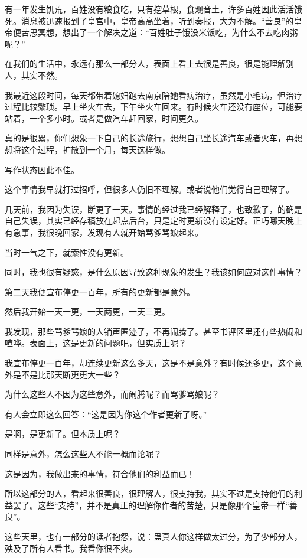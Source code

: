 \begin{this_body}
有一年发生饥荒，百姓没有粮食吃，只有挖草根，食观音土，许多百姓因此活活饿死。消息被迅速报到了皇宫中，皇帝高高坐着，听到奏报，大为不解。“善良”的皇帝便苦思冥想，想出了一个解决之道：“百姓肚子饿没米饭吃，为什么不去吃肉粥呢？”

在我们的生活中，永远有那么一部分人，表面上看上去很是善良，很是能理解别人，其实不然。

我最近这段时间，每天都带着媳妇跑去南京陪她看病治疗，虽然是小毛病，但治疗过程比较繁琐。早上坐火车去，下午坐火车回来。有时候火车还没有座位，可能要站着，一个多小时。或者是做汽车赶回家，时间更久。

真的是很累，你们想象一下自己的长途旅行，想想自己坐长途汽车或者火车，再想想将这个过程，扩散到一个月，每天这样做。

写作状态因此不佳。

这个事情我早就打过招呼，但很多人仍旧不理解。或者说他们觉得自己理解了。

几天前，我因为失误，断更了一天。事情的经过我已经解释了，也致歉了，的确是自己失误，其实已经存稿放在起点后台，只是定时更新没有设定好。正巧哪天晚上有急事，我很晚回家，发现有人就开始骂爹骂娘起来。

当时一气之下，就索性没有更新。

同时，我也很有疑惑，是什么原因导致这种现象的发生？我该如何应对这件事情？

第二天我便宣布停更一百年，所有的更新都是意外。

然后我开始一天一更，一天两更，一天三更。

我发现，那些骂爹骂娘的人销声匿迹了，不再闹腾了。甚至书评区里还有些热闹和喧哗。表面上，这是更新的问题吧，但实质上呢？

我宣布停更一百年，却连续更新这么多天，这是不是意外？有时候还多更，这个意外是不是比那天断更更大一些？

为什么这些人不因为这些意外，而闹腾呢？而骂爹骂娘呢？

有人会立即这么回答：“这是因为你这个作者更新了呀。”

是啊，是更新了。但本质上呢？

同样是意外，怎么这些人不能一概而论呢？

这是因为，我做出来的事情，符合他们的利益而已！

所以这部分的人，看起来很善良，很理解人，很支持我，其实不过是支持他们的利益罢了。这些“支持”，并不是真正的理解你作者的苦楚，只是像那个皇帝一样“善良”。

这些天里，也有一部分的读者抱怨，说：蛊真人你这样做太过分，为了少部分人，殃及了所有人看书。我看你很不爽。


\end{this_body}
